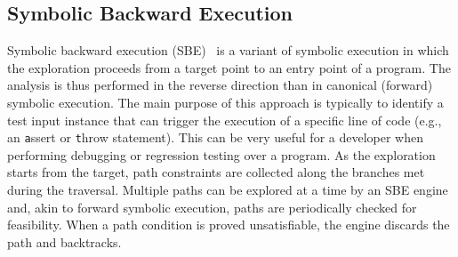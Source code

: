 



\subsection{Symbolic Backward Execution}
\label{ss:backward}
Symbolic backward execution (SBE)~\cite{CFS-PLDI09,DA-ASE14} is a variant of symbolic execution in which the exploration proceeds from a target point to an entry point of a program. The analysis is thus performed in the reverse direction than in canonical (forward) symbolic execution. The main purpose of this approach is typically to identify a test input instance that can trigger the execution of a specific line of code (e.g., an {\texttt assert} or {\texttt throw} statement). %
This can be very useful for a developer when performing debugging or regression testing over a program.
As the exploration starts from the target, path constraints are collected along the branches met during the traversal. Multiple paths can be explored at a time by an SBE engine and, akin to forward symbolic execution, paths are periodically checked for feasibility. When a path condition is proved unsatisfiable, the engine discards the path and backtracks.


